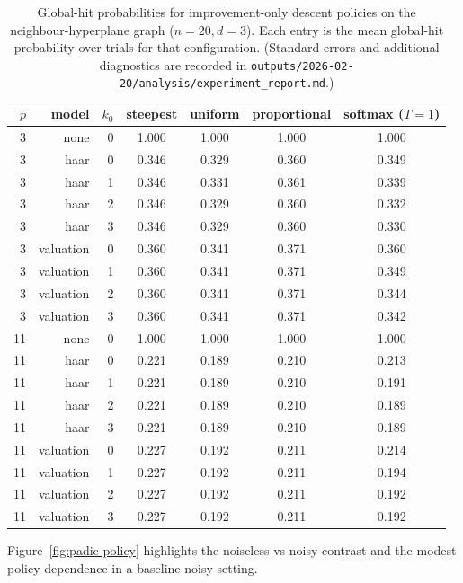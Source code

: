 \documentclass[11pt]{article}
\begin{document}
\begin{table}[t]
\centering
\begin{tabular}{@{}rrrcccc@{}}
\toprule
$p$ & model & $k_0$ & steepest & uniform & proportional & softmax ($T{=}1$) \\
\midrule
3  & none      & 0 & 1.000 & 1.000 & 1.000 & 1.000 \\
3  & haar      & 0 & 0.346 & 0.329 & 0.360 & 0.349 \\
3  & haar      & 1 & 0.346 & 0.331 & 0.361 & 0.339 \\
3  & haar      & 2 & 0.346 & 0.329 & 0.360 & 0.332 \\
3  & haar      & 3 & 0.346 & 0.329 & 0.360 & 0.330 \\
3  & valuation & 0 & 0.360 & 0.341 & 0.371 & 0.360 \\
3  & valuation & 1 & 0.360 & 0.341 & 0.371 & 0.349 \\
3  & valuation & 2 & 0.360 & 0.341 & 0.371 & 0.344 \\
3  & valuation & 3 & 0.360 & 0.341 & 0.371 & 0.342 \\
\midrule
11 & none      & 0 & 1.000 & 1.000 & 1.000 & 1.000 \\
11 & haar      & 0 & 0.221 & 0.189 & 0.210 & 0.213 \\
11 & haar      & 1 & 0.221 & 0.189 & 0.210 & 0.191 \\
11 & haar      & 2 & 0.221 & 0.189 & 0.210 & 0.189 \\
11 & haar      & 3 & 0.221 & 0.189 & 0.210 & 0.189 \\
11 & valuation & 0 & 0.227 & 0.192 & 0.211 & 0.214 \\
11 & valuation & 1 & 0.227 & 0.192 & 0.211 & 0.194 \\
11 & valuation & 2 & 0.227 & 0.192 & 0.211 & 0.192 \\
11 & valuation & 3 & 0.227 & 0.192 & 0.211 & 0.192 \\
\bottomrule
\end{tabular}
\caption{Global-hit probabilities for improvement-only descent policies on the neighbour-hyperplane graph ($n=20,d=3$). Each entry is the mean global-hit probability over trials for that configuration. (Standard errors and additional diagnostics are recorded in \texttt{outputs/2026-02-20/analysis/experiment\_report.md}.)}
\label{tab:padic-summary}
\end{table}

Figure~\ref{fig:padic-policy} highlights the noiseless-vs-noisy contrast and the modest policy dependence in a baseline noisy setting.
\end{document}
